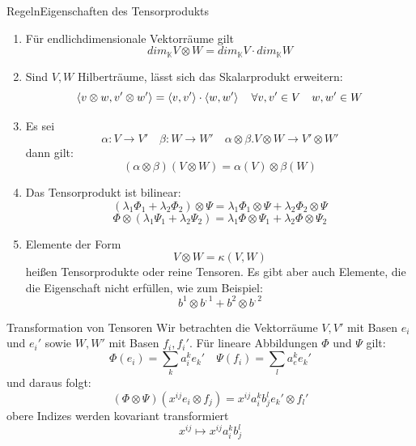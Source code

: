 \begin{Satz}{Regeln}{Eigenschaften des Tensorprodukts}
\begin{enumerate}
    \item Für endlichdimensionale Vektorräume gilt
    $$dim_{\mathbb{K}}V\otimes W = dim_{\mathbb{K}} V \cdot dim_{\mathbb{K}} W$$
    \item Sind $V,W$ Hilberträume, lässt sich das Skalarprodukt erweitern:
    $$\braket{v\otimes w, v'\otimes w'}=\braket{v,v'}\cdot \braket{w, w'} \quad \forall v,v'\in V\quad w,w'\in W$$
    \item Es sei $$\alpha: V\rightarrow V' \quad \beta:W\rightarrow W' \quad \alpha\otimes\beta. V\otimes W \rightarrow V'\otimes W'$$
    dann gilt:
    $$(\alpha\otimes\beta)(V\otimes W)=\alpha(V)\otimes \beta(W)$$
    \item Das Tensorprodukt ist bilinear:
    $$(\lambda_1\Phi_1+\lambda_2\Phi_2)\otimes \Psi = \lambda_1\Phi_1 \otimes \Psi + \lambda_2\Phi_2 \otimes \Psi$$
    $$\Phi\otimes (\lambda_1\Psi_1+ \lambda_2\Psi_2) = \lambda_1\Phi \otimes \Psi_1 + \lambda_2\Phi \otimes \Psi_2$$
    \item Elemente der Form
    $$V\otimes W=\kappa(V,W)$$
    heißen Tensorprodukte oder reine Tensoren. Es gibt aber auch Elemente, die die Eigenschaft nicht erfüllen, wie zum Beispiel:
    $$b^1\otimes b^{,1}+b^2\otimes b^{,2}$$
\end{enumerate}
\end{Satz}
\begin{Def}{Transformation von Tensoren}
    Wir betrachten die Vektorräume $V,V'$ mit Basen $e_i$ und $e_i'$ sowie $W, W'$ mit Basen $f_i, f_i'$. Für lineare Abbildungen $\Phi$ und $\Psi$ gilt:
    $$\Phi(e_i)=\sum_k a^k _i e_k' \quad \Psi(f_i)=\sum_l a^k _e e_k'$$
    und daraus folgt:
    $$(\Phi \otimes \Psi)(x^{ij}e_i\otimes f_j) =x^{ij}a^k_i b^l_j e_k'\otimes f_l'$$
    obere Indizes werden kovariant transformiert
    $$x^{ij}\mapsto x^{ij}a^k_ib^l_j$$
\end{Def}

